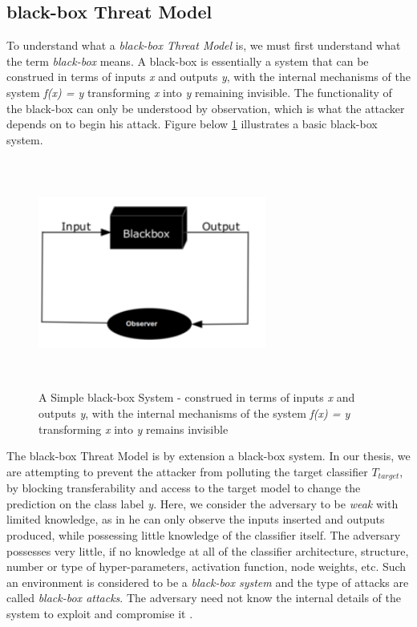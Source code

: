 \documentclass[grad,lot,lof,11pt,oneside,onehalfspace]{RUthesis}
\begin{document}
\subsection{black-box Threat Model}
To understand what a \textit{black-box Threat Model} is, we must first understand what the term \textit{black-box} means. A black-box is essentially a system that can be construed in terms of inputs \textit{x} and outputs \textit{y}, with the internal mechanisms of the system \textit{f(x) = y} transforming \textit{x} into \textit{y} remaining invisible. The functionality of the black-box can only be understood by observation, which is what the attacker depends on to begin his attack. Figure below \ref{fig:BlackBox} illustrates a basic black-box system. \\
\begin{figure}[h]
\centering
\includegraphics[width=7.5cm, height=7.5cm]{"Images/Chapter 2/BlackBox"}
\caption{A Simple black-box System - construed in terms of inputs \textit{x} and outputs \textit{y}, with the internal mechanisms of the system \textit{f(x) = y} transforming \textit{x} into \textit{y} remains invisible}
\label{fig:BlackBox}
\end{figure}
The black-box Threat Model is by extension a black-box system. In our thesis, we are attempting to prevent the attacker from polluting the target classifier \textit{$T_{target}$}, by blocking transferability and access to the target model to change the prediction on the class label \textit{y}. Here, we consider the adversary to be \textit{weak} with limited knowledge, as in he can only observe the inputs inserted and outputs produced, while possessing little knowledge of the classifier itself. The adversary possesses very little, if no knowledge at all of the classifier architecture, structure, number or type of hyper-parameters, activation function, node weights, etc. Such an environment is considered to be a \textit{black-box system} and the type of attacks are called \textit{black-box attacks}. The adversary need not know the internal details of the system to exploit and compromise it \cite{papernot_practical_2017}.\\
\end{document}
